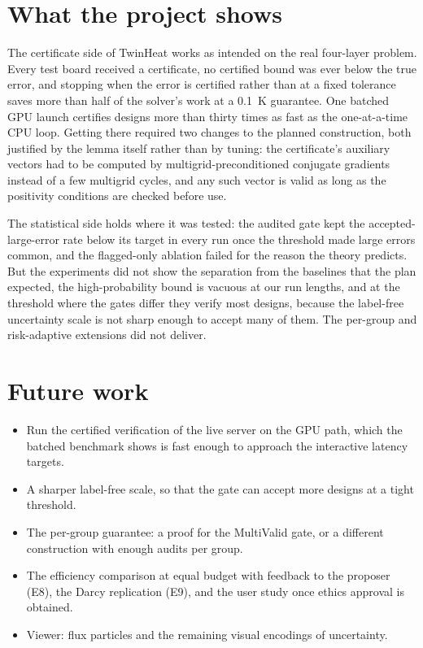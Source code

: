 \section{What the project shows}
The certificate side of TwinHeat works as intended on the real four-layer problem. Every test board
received a certificate, no certified bound was ever below the true error, and stopping when the
error is certified rather than at a fixed tolerance saves more than half of the solver's work at a
0.1~K guarantee. One batched GPU launch certifies designs more than thirty times as fast as the
one-at-a-time CPU loop. Getting there required two changes to the planned construction, both
justified by the lemma itself rather than by tuning: the certificate's auxiliary vectors had to be
computed by multigrid-preconditioned conjugate gradients instead of a few multigrid cycles, and
any such vector is valid as long as the positivity conditions are checked before use.

The statistical side holds where it was tested: the audited gate kept the accepted-large-error
rate below its target in every run once the threshold made large errors common, and the
flagged-only ablation failed for the reason the theory predicts. But the experiments did not show
the separation from the baselines that the plan expected, the high-probability bound is vacuous at
our run lengths, and at the threshold where the gates differ they verify most designs, because the
label-free uncertainty scale is not sharp enough to accept many of them. The per-group and
risk-adaptive extensions did not deliver.

\section{Future work}
\begin{itemize}
\item Run the certified verification of the live server on the GPU path, which the batched
benchmark shows is fast enough to approach the interactive latency targets.
\item A sharper label-free scale, so that the gate can accept more designs at a tight threshold.
\item The per-group guarantee: a proof for the MultiValid gate, or a different construction with
enough audits per group.
\item The efficiency comparison at equal budget with feedback to the proposer (E8), the Darcy
replication (E9), and the user study once ethics approval is obtained.
\item Viewer: flux particles and the remaining visual encodings of uncertainty.
\end{itemize}
